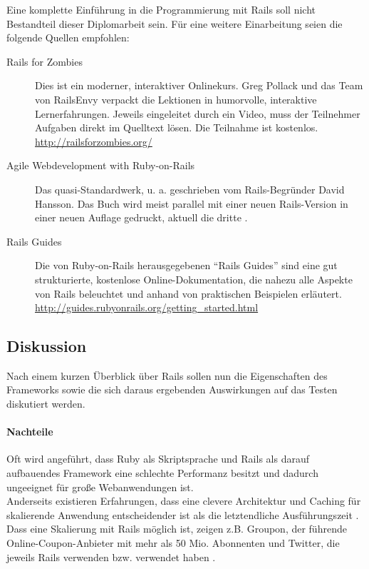 Eine komplette Einführung in die Programmierung mit Rails soll nicht Bestandteil dieser Diplomarbeit sein. Für eine weitere Einarbeitung seien die folgende Quellen empfohlen:
\begin{description}
 \item[Rails for Zombies] Dies ist ein moderner, interaktiver Onlinekurs. Greg Pollack und das Team von RailsEnvy verpackt die Lektionen in humorvolle, interaktive Lernerfahrungen. Jeweils eingeleitet durch ein Video, muss der Teilnehmer Aufgaben direkt im Quelltext lösen. Die Teilnahme ist kostenlos.\\
 \url{http://railsforzombies.org/}
 \item[Agile Webdevelopment with Ruby-on-Rails] Das quasi-Standardwerk, u. a. geschrieben vom Rails-Begründer David Hansson. Das Buch wird meist parallel mit einer neuen Rails-Version in einer neuen Auflage gedruckt, aktuell die dritte \citep{ruby_agile_2009}.
 \item[Rails Guides] Die von Ruby-on-Rails herausgegebenen "`Rails Guides"' sind eine gut strukturierte, kostenlose Online-Dokumentation, die nahezu alle Aspekte von Rails beleuchtet und anhand von praktischen Beispielen erläutert.\\
 \url{http://guides.rubyonrails.org/getting_started.html}
 \end{description}



\subsection{Diskussion}
Nach einem kurzen Überblick über Rails sollen nun die Eigenschaften des Frameworks sowie die sich daraus ergebenden Auswirkungen auf das Testen diskutiert werden.

\paragraph{Nachteile}

Oft wird angeführt, dass Ruby als Skriptsprache und Rails als darauf aufbauendes Framework eine schlechte Performanz besitzt und dadurch ungeeignet für große Webanwendungen ist.\\
Anderseits existieren Erfahrungen, dass eine clevere Architektur und Caching für skalierende Anwendung entscheidender ist als die letztendliche Ausführungszeit \citep{kirk_haines_ruby_2010}.
Dass eine Skalierung mit Rails möglich ist, zeigen z.B. Groupon, der führende Online-Coupon-Anbieter mit mehr als 50 Mio. Abonnenten und Twitter, die jeweils Rails verwenden bzw. verwendet haben \citep{ruby_on_rails_2011}.

